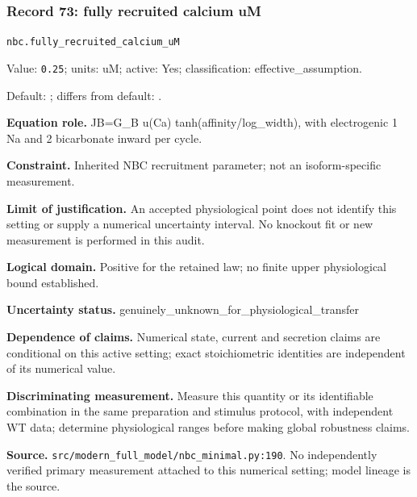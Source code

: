 \subsubsection*{Record 73: fully recruited calcium uM}
{\small \nolinkurl{nbc.fully_recruited_calcium_uM}\par

Value: \texttt{0.25}; units: uM; active: Yes; classification: effective\_assumption.\par

Default: ; differs from default: .\par

\textbf{Equation role.} JB=G\_B u(Ca) tanh(affinity/log\_width), with electrogenic 1 Na and 2 bicarbonate inward per cycle.\par

\textbf{Constraint.} Inherited NBC recruitment parameter; not an isoform-specific measurement.\par

\textbf{Limit of justification.} An accepted physiological point does not identify this setting or supply a numerical uncertainty interval. No knockout fit or new measurement is performed in this audit.\par

\textbf{Logical domain.} Positive for the retained law; no finite upper physiological bound established.\par

\textbf{Uncertainty status.} genuinely\_unknown\_for\_physiological\_transfer\par

\textbf{Dependence of claims.} Numerical state, current and secretion claims are conditional on this active setting; exact stoichiometric identities are independent of its numerical value.\par

\textbf{Discriminating measurement.} Measure this quantity or its identifiable combination in the same preparation and stimulus protocol, with independent WT data; determine physiological ranges before making global robustness claims.\par

\textbf{Source.} \nolinkurl{src/modern_full_model/nbc_minimal.py:190}. No independently verified primary measurement attached to this numerical setting; model lineage is the source.\par}

